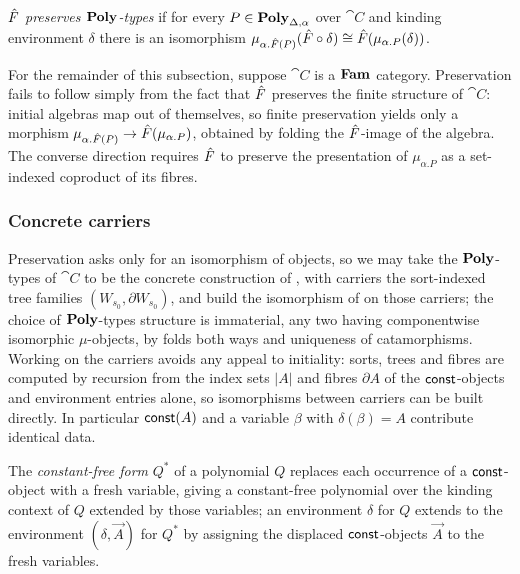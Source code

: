 \begin{definition}
\label{def:conservativity:preserves-poly}
$\hat{F}$ \emph{preserves $\mathbf{Poly}$-types} if for every $P \in \mathbf{Poly}_{\Delta,\alpha}$ over
$\cat{C}$ and kinding environment $\delta$ there is an isomorphism
$\mu_{\alpha.\hat{F}(P)}(\hat{F} \circ \delta) \cong \hat{F}(\mu_{\alpha.P}(\delta))$.
\end{definition}
\noindent
For the remainder of this subsection, suppose $\cat{C}$ is a $\mathbf{Fam}$ category.
Preservation fails to follow simply from the fact that $\hat{F}$ preserves the finite
structure of $\cat{C}$: initial algebras
map out of themselves, so finite preservation yields only a morphism $\mu_{\alpha.\hat{F}(P)}
\to \hat{F}(\mu_{\alpha.P})$, obtained by folding the $\hat{F}$-image of the algebra. The converse direction
requires $\hat{F}$ to preserve the presentation of $\mu_{\alpha.P}$ as a set-indexed coproduct of its
fibres.

\subsubsection{Concrete carriers}

Preservation asks only for an
isomorphism of objects, so we may take the $\mathbf{Poly}$-types of $\cat{C}$ to be the concrete
construction of , with carriers the sort-indexed tree
families $(W_{s_0}, \partial W_{s_0})$, and build the isomorphism of
 on those carriers; the choice of $\mathbf{Poly}$-types structure is immaterial, any two having componentwise
isomorphic $\mu$-objects, by folds both ways and uniqueness of catamorphisms. Working on the
carriers avoids any appeal to initiality: sorts, trees and fibres are computed by recursion from
the index sets $|A|$ and fibres $\partial A$ of the $\mathsf{const}$-objects and environment entries
alone, so isomorphisms between carriers can be built directly. In particular $\mathsf{const}(A)$ and a
variable $\beta$ with $\delta(\beta) = A$ contribute identical data.

\begin{definition}
\label{def:conservativity:constant-free-form}
The \emph{constant-free form} $Q^{*}$ of a polynomial $Q$ replaces each occurrence of a
$\mathsf{const}$-object with a fresh variable, giving a constant-free polynomial over the kinding context
of $Q$ extended by those variables; an environment $\delta$ for $Q$ extends to the environment
$(\delta, \vec{A})$ for $Q^{*}$ by assigning the displaced $\mathsf{const}$-objects $\vec{A}$ to the
fresh variables.
\end{definition}


